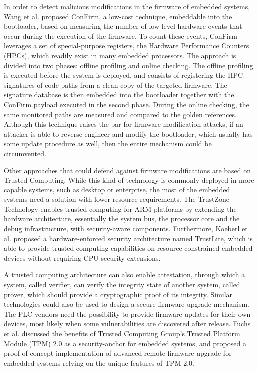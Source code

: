 In order to detect malicious modifications in the firmware of embedded systems, Wang et al. \cite{confirm} proposed ConFirm,
a low-cost technique, embeddable into the bootloader, based on measuring the number of low-level hardware events that occur during the execution of the firmware.
To count these events, ConFirm leverages a set of special-purpose registers, the Hardware Performance Counters (HPCs), which readily exist in many embedded processors.
The approach is divided into two phases: offline profiling and online checking. The offline profiling is executed before the system is deployed,
and consists of registering the HPC signatures of code paths from a clean copy of the targeted firmware. The signature database is then embedded into the bootloader
together with the ConFirm payload executed in the second phase. During the online checking, the same monitored paths are measured and compared to the golden references.
Although this technique raises the bar for firmware modification attacks, if an attacker is able to reverse engineer and modify the bootloader,
which usually has some update procedure as well, then the entire mechanism could be circumvented.

Other approaches that could defend against firmware modifications are based on Trusted Computing. While this kind of technology is commonly deployed
in more capable systems, such as desktop or enterprise, the most of the embedded systems need a solution with lower resource requirements.
The TrustZone Technology \cite{trustzone} enables trusted computing for ARM platforms by extending the hardware architecture,
essentially the system bus, the processor core and the debug infrastructure, with security-aware components.
Furthermore, Koeberl et al. \cite{trustlite} proposed a hardware-enforced security architecture named TrustLite, which is able to provide trusted computing capabilities
on resource-constrained embedded devices without requiring CPU security extensions.

A trusted computing architecture can also enable attestation, through which a system, called verifier, can verify the integrity state of another system, called prover,
which should provide a cryptographic proof of its integrity. Similar technologies could also be used to design a secure firmware upgrade mechanism.
The PLC vendors need the possibility to provide firmware updates for their own devices, most likely when some vulnerabilities are discovered after release.
Fuchs et al. \cite{tpm2} discussed the benefits of Trusted Computing Group's Trusted Platform Module (TPM) 2.0 as a security-anchor for embedded systems,
and proposed a proof-of-concept implementation of advanced remote firmware upgrade for embedded systems relying on the unique features of TPM 2.0.


